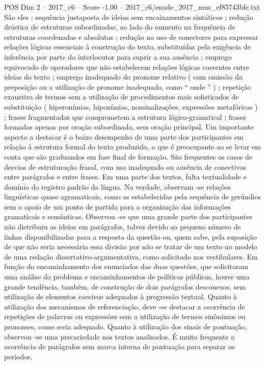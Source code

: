 \begin{textsample}{POS Dim 2 – 2017\_c6 – Score -1.00 – 2017\_c6/enade\_2017\_mus\_ef85743bfe.txt}
São eles : sequência justaposta de ideias sem encaixamentos sintáticos ; redução drástica de estruturas subordinadas, ao lado do aumento na frequência de estruturas coordenadas e absolutas ; redução no uso de conectores para expressar relações lógicas essenciais à construção do texto, substituídas pela exigência de inferência por parte do interlocutor para suprir a sua ausência ; emprego equivocado de operadores que não estabelecem relações lógicas coerentes entre ideias do texto ; emprego inadequado do pronome relativo ( com omissão da preposição ou a utilização de pronome inadequado, como “ onde ” ) ; repetição exaustiva de termos sem a utilização de procedimentos mais sofisticados de substituição ( hiperonímias, hiponímias, nominalizações, expressões metafóricas ) ; frases fragmentadas que comprometem a estrutura lógico-gramatical ; frases formadas apenas por oração subordinada, sem oração principal.
Um importante aspecto a destacar é o baixo desempenho de uma parte dos participantes em relação à estrutura formal do texto produzido, o que é preocupante ao se levar em conta que são graduandos em fase final de formação.
São frequentes os casos de desvios de estruturação frasal, com uso inadequado ou ausência de conectivos entre parágrafos e entre frases.
Em uma parte dos textos, falta textualidade e domínio do registro padrão da língua.
Na verdade, observam -se relações linguísticas quase agramaticais, como as estabelecidas pela sequência de gerúndios sem o apoio de um ponto de partida para a organização das informações gramaticais e semânticas.
Observou -se que uma grande parte dos participantes não distribuiu as ideias em parágrafos, talvez devido ao pequeno número de linhas disponibilizadas para a resposta da questão ou, quem sabe, pela suposição de que não seria necessária essa divisão por não se tratar de um texto no modelo de uma redação dissertativo-argumentativa, como solicitado nos vestibulares.
Em função do encaminhamento dos enunciados das duas questões, que solicitaram uma análise do problema e encaminhamentos de políticas públicas, houve uma grande tendência, também, de construção de dois parágrafos desconexos, sem utilização de elementos coesivos adequados à progressão textual.
Quanto à utilização dos mecanismos de referenciação, deve -se destacar a ocorrência de repetições de palavras ou expressões sem a utilização de termos sinônimos ou pronomes, como seria adequado.
Quanto à utilização dos sinais de pontuação, observou -se uma precariedade nos textos analisados.
É muito frequente a ocorrência de parágrafos sem marca interna de pontuação para separar os períodos.

\end{textsample}
